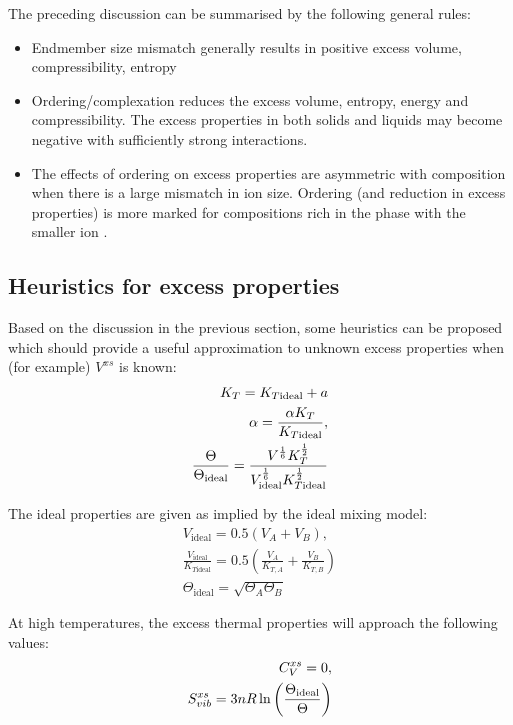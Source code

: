 The preceding discussion can be summarised by the following general rules:
\begin{itemize}
\item Endmember size mismatch generally results in positive excess volume, compressibility, entropy
\item Ordering/complexation reduces the excess volume, entropy, energy and compressibility. The excess properties in both solids and liquids may become negative with sufficiently strong interactions.
\item The effects of ordering on excess properties are asymmetric with composition when there is a large mismatch in ion size. Ordering (and reduction in excess properties) is more marked for compositions rich in the phase with the smaller ion \citep{NW1980}.
\end{itemize}

\subsection{Heuristics for excess properties}

Based on the discussion in the previous section, some heuristics can be proposed which should provide a useful approximation to unknown excess properties when (for example) $V^{xs}$ is known:
\begin{eqnarray}
K_T = K_{T\textrm{ideal}} + a\\
\alpha  = \frac{\alpha K_T}{K_{T\textrm{ideal}}}, \\
\frac{\Theta}{\Theta_{\textrm{ideal}}} = \frac{V^{1 \over 6} K_T^{1 \over 2}}{V_{\textrm{ideal}}^{1 \over 6} K_{T\textrm{ideal}}^{1 \over 2}}
\end{eqnarray}

The ideal properties are given as implied by the ideal mixing model:
\begin{eqnarray}
V_{\textrm{ideal}} = 0.5\left(V_A + V_B\right),\\
\frac{V_{\textrm{ideal}}}{K_{T\textrm{ideal}}} = 0.5 \left( \frac{V_{A}}{K_{T, A}} + \frac{V_{B}}{K_{T, B}} \right) \\
\Theta_{\textrm{ideal}} = \sqrt { \Theta_A \Theta_B }
\end{eqnarray}

At high temperatures, the excess thermal properties will approach the following values:
\begin{eqnarray}
C_V^{xs} = 0, \\
S_{vib}^{xs} = 3nR \ln \left( { \Theta_{\textrm{ideal}} \over \Theta} \right)
\end{eqnarray}


